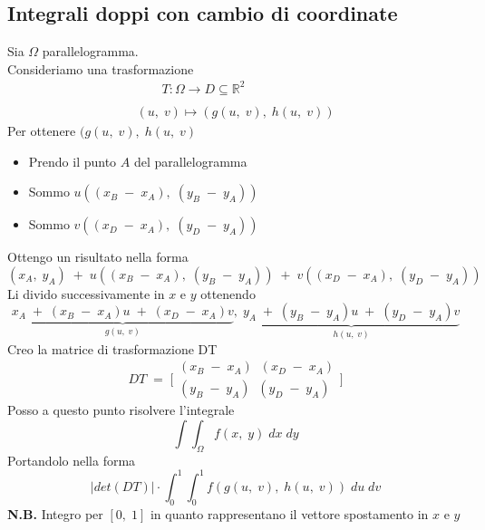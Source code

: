 \documentclass[a4paper, 10pt]{article}
\begin{document}
			\subsection{Integrali doppi con cambio di coordinate}
				Sia $\Omega$ parallelogramma.\\
				Consideriamo una trasformazione
					\[
						\begin{array}{l}
							\quad\quad T : \Omega \rightarrow D \subseteq \mathbb{R}^2 \\
							\\
							(u,\; v) \mapsto (g(u,\; v),\; h(u,\; v))
						\end{array}
					\]
				Per ottenere $ (g(u,\; v),\; h(u,\; v) $ 
					\begin{itemize}
						\item Prendo il punto $ A $ del parallelogramma
						\item Sommo $ u((x_B\; -\; x_A),\; (y_B\; -\; y_A)) $
						\item Sommo $ v((x_D\; -\; x_A),\; (y_D\; -\; y_A)) $
					\end{itemize}
				Ottengo un risultato nella forma
					\[
						(x_A,\; y_A)\; +\; u((x_B\; -\; x_A),\; (y_B\; -\; y_A))\; +\; v((x_D\; -\; x_A),\; (y_D\; -\; y_A))
					\]	
 				Li divido successivamente in $ x $ e $ y $ ottenendo
 					\[
	 					\underbrace{x_A\; +\; (x_B\; -\; x_A)u\; +\; (x_D\; -\; x_A)v}_{g(u,\; v)},\; \underbrace{y_A\; +\; (y_B\; -\; y_A)u\; +\; (y_D\; -\; y_A)v}_{h(u,\; v)}
 					\]
 				Creo la matrice di trasformazione DT
 					\[
 					DT\; =\; \Biggl[
	 					\begin{array}{l}
		 					(x_B\; -\; x_A)\;\; (x_D\; -\; x_A)\\
		 					(y_B\; -\; y_A)\;\; (y_D\; -\; y_A)
	 					\end{array}
 					\Biggl]
 					\]
 				Posso a questo punto risolvere l'integrale
 					\[
	 					\int{\int_{\Omega}^{ }{f(x,\; y)}}\; dx\; dy
 					\]
 				Portandolo nella forma
 					\[
 						\vert det(DT) \vert \cdot \int_{0}^{1}{\int_{0}^{1}{f(g(u,\; v),\; h(u,\; v))}}\;du\;dv
 					\]
 				\textbf{N.B.} Integro per $ [0,\; 1] $ in quanto rappresentano il vettore spostamento in $ x $ e $ y $
 			
\end{document}
